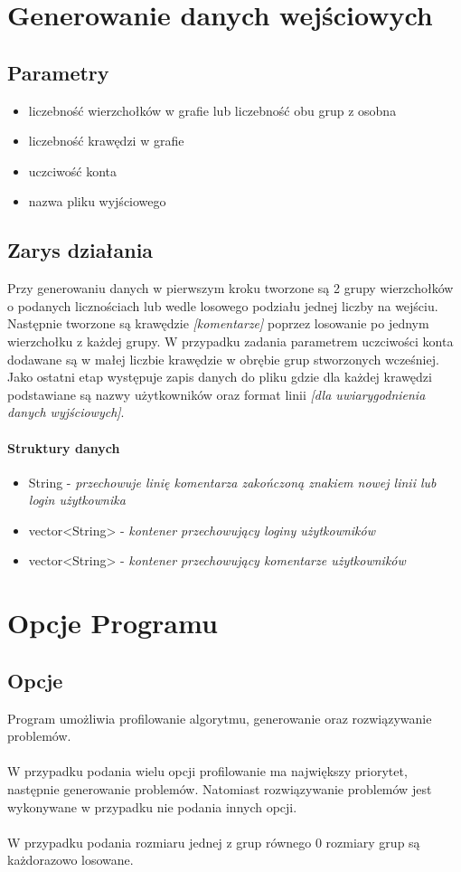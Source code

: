 \documentclass[11pt]{article}
\newcommand{\+}{\discretionary{\mbox{\scriptsize$\hookleftarrow$}}{}{}}
\begin{document}
\section{Generowanie danych wejściowych}
\subsection{Parametry}
\begin{itemize}
\item
liczebność wierzchołków w grafie lub liczebność obu grup z osobna
\item
liczebność krawędzi w grafie
\item
uczciwość konta
\item
nazwa pliku wyjściowego
\end{itemize}
\subsection{Zarys działania}
  Przy generowaniu danych w pierwszym kroku tworzone są 2 grupy wierzchołków o podanych licznościach lub wedle losowego podziału jednej liczby na wejściu. Następnie tworzone są krawędzie \textsl{[komentarze]} poprzez losowanie po jednym wierzchołku z każdej grupy. W przypadku zadania parametrem uczciwości konta dodawane są w małej liczbie krawędzie w obrębie grup stworzonych wcześniej. Jako ostatni etap występuje zapis danych do pliku gdzie dla każdej krawędzi podstawiane są nazwy użytkowników oraz format linii \textsl{[dla uwiarygodnienia danych wyjściowych]}.\\
\paragraph{Struktury danych}
\begin{itemize}
	\item 
  String - \textsl{przechowuje linię komentarza zakończoną znakiem nowej linii lub login użytkownika}
 	\item
  vector<String> - \textsl{kontener przechowujący loginy użytkowników}
  	\item 
  vector<String> - \textsl{kontener przechowujący komentarze użytkowników}

\end{itemize}
\section{Opcje Programu}
\subsection{Opcje}
Program umożliwia profilowanie algorytmu, generowanie oraz rozwiązywanie problemów.
\\\\
W przypadku podania wielu opcji profilowanie ma największy priorytet, następnie generowanie problemów. Natomiast rozwiązywanie problemów jest wykonywane w przypadku nie podania innych opcji.
\\\\
W przypadku podania rozmiaru jednej z grup równego 0 rozmiary grup są każdorazowo losowane.
\end{document}

